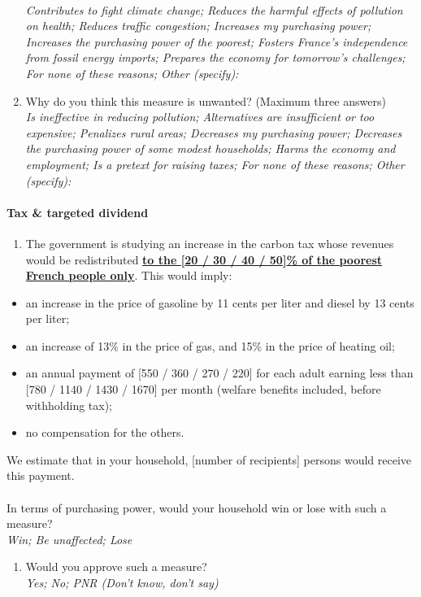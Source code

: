 \documentclass[12pt]{article} %
\begin{document}
\begin{appendices}
\begin{enumerate}[resume,leftmargin=*]
\emph{}\\
\emph{Contributes to fight climate change; Reduces the harmful 
effects of pollution on health; Reduces traffic congestion; Increases
my purchasing power; Increases the purchasing power of the poorest;
Fosters France's independence from fossil energy imports; Prepares
the economy for tomorrow's challenges; For none of these reasons;
Other (specify): }
\item Why do you think this measure is unwanted? (Maximum three answers)
\emph{}\\
\emph{Is ineffective in reducing pollution; Alternatives are insufficient
or too expensive; Penalizes rural areas; Decreases my purchasing power;
Decreases the purchasing power of some modest households; Harms the
economy and employment; Is a pretext for raising taxes; For none of
these reasons; Other (specify):} 
\end{enumerate}

\paragraph{Tax \& targeted dividend}
\begin{enumerate}[resume,leftmargin=*]
\item The government is studying an increase in the carbon tax whose revenues
would be redistributed \textbf{\underline{to the {[}20 / 30 / 40 /
50{]}\% of the poorest French people only}}. This would imply: 
\end{enumerate}
\begin{itemize}
\item an increase in the price of gasoline by 11 cents per liter and diesel
by 13 cents per liter; 
\item an increase of 13\% in the price of gas, and 15\% in the price of
heating oil; 
\item an annual payment of {[}550 / 360 / 270 / 220{]}\euros{} for each adult earning
less than {[}780 / 1140 / 1430 / 1670{]}\euros{} per month (welfare benefits
included, before withholding tax); 
\item no compensation for the others. 
\end{itemize}
We estimate that in your household, {[}number of recipients{]} persons
would receive this payment. \\
\\
In terms of purchasing power, would your household win or lose with
such a measure? \emph{}\\
\emph{Win; Be unaffected; Lose}
\begin{enumerate}[resume,leftmargin=*]
\item Would you approve such a measure? \emph{}\\
\emph{Yes; No; PNR (Don't know, don't say)} 
\end{enumerate}


\end{appendices}
\end{document}
